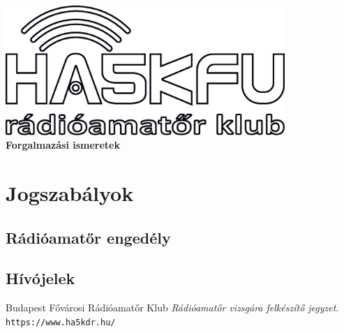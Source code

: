 \documentclass[12pt,a4paper]{article}
\begin{document}
\begin{center}
\includegraphics[width=300pt,keepaspectratio]{figures/ha5kfu.eps}
\\[2cm]

{\huge \bfseries Forgalmazási ismeretek \\[2cm]}



\end{center}
\tableofcontents 
\newpage
\section{Jogszabályok}
\subsection{Rádióamatőr engedély}
\subsection{Hívójelek}

\newpage
\begin{thebibliography}{9}
Budapest Fővárosi Rádióamatőr Klub 
\textit{Rádióamatőr vizsgára felkészítő jegyzet}. 
\\\texttt{https://www.ha5kdr.hu/}


\end{thebibliography}
\end{document}
